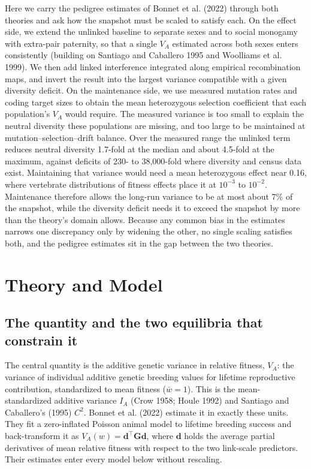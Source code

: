 \documentclass[12pt]{article}
\begin{document}
Here we carry the pedigree estimates of Bonnet et al. (2022) through both theories and ask how the snapshot must be scaled to satisfy each. On the effect side, we extend the unlinked baseline to separate sexes and to social monogamy with extra-pair paternity, so that a single $V_A$ estimated across both sexes enters consistently (building on Santiago and Caballero 1995 and Woolliams et al. 1999). We then add linked interference integrated along empirical recombination maps, and invert the result into the largest variance compatible with a given diversity deficit. On the maintenance side, we use measured mutation rates and coding target sizes to obtain the mean heterozygous selection coefficient that each population's $V_A$ would require. The measured variance is too small to explain the neutral diversity these populations are missing, and too large to be maintained at mutation--selection--drift balance. Over the measured range the unlinked term reduces neutral diversity 1.7-fold at the median and about 4.5-fold at the maximum, against deficits of 230- to 38,000-fold where diversity and census data exist. Maintaining that variance would need a mean heterozygous effect near 0.16, where vertebrate distributions of fitness effects place it at $10^{-3}$ to $10^{-2}$. Maintenance therefore allows the long-run variance to be at most about 7\% of the snapshot, while the diversity deficit needs it to exceed the snapshot by more than the theory's domain allows. Because any common bias in the estimates narrows one discrepancy only by widening the other, no single scaling satisfies both, and the pedigree estimates sit in the gap between the two theories.

\section{Theory and Model}
\subsection{The quantity and the two equilibria that constrain it}\label{sec:quantity}
The central quantity is the additive genetic variance in relative fitness, $V_A$: the variance of individual additive genetic breeding values for lifetime reproductive contribution, standardized to mean fitness ($\bar{w} = 1$). This is the mean-standardized additive variance $I_A$ (Crow 1958; Houle 1992) and Santiago and Caballero's (1995) $C^2$. Bonnet et al. (2022) estimate it in exactly these units. They fit a zero-inflated Poisson animal model to lifetime breeding success and back-transform it as $V_A(w) = \mathbf{d}^\top\mathbf{G}\mathbf{d}$, where $\mathbf{d}$ holds the average partial derivatives of mean relative fitness with respect to the two link-scale predictors. Their estimates enter every model below without rescaling.
\end{document}
